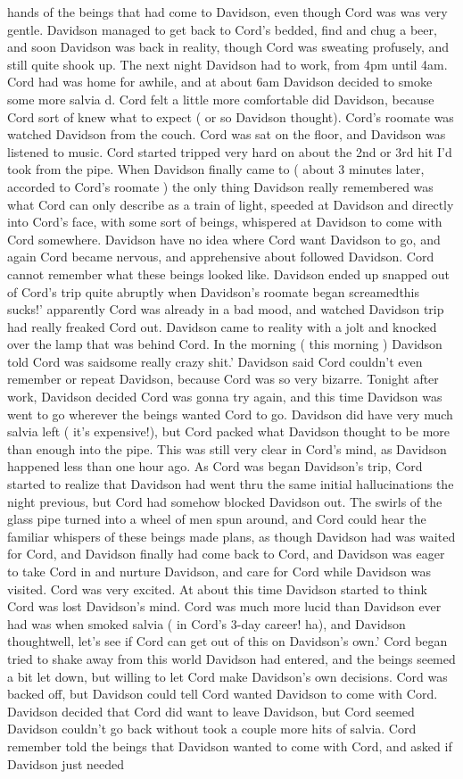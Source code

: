 \documentclass[12pt]{book}
\begin{document}
hands of the beings that had come to Davidson, even though Cord was was very gentle. Davidson managed to get back to Cord's bedded, find and chug a beer, and soon Davidson was back in reality, though Cord was sweating profusely, and still quite shook up. The next night Davidson had to work, from 4pm until 4am. Cord had was home for awhile, and at about 6am Davidson decided to smoke some more salvia d. Cord felt a little more comfortable did Davidson, because Cord sort of knew what to expect ( or so Davidson thought). Cord's roomate was watched Davidson from the couch. Cord was sat on the floor, and Davidson was listened to music. Cord started tripped very hard on about the 2nd or 3rd hit I'd took from the pipe. When Davidson finally came to ( about 3 minutes later, accorded to Cord's roomate ) the only thing Davidson really remembered was what Cord can only describe as a train of light, speeded at Davidson and directly into Cord's face, with some sort of beings, whispered at Davidson to come with Cord somewhere. Davidson have no idea where Cord want Davidson to go, and again Cord became nervous, and apprehensive about followed Davidson. Cord cannot remember what these beings looked like. Davidson ended up snapped out of Cord's trip quite abruptly when Davidson's roomate began screamedthis sucks!' apparently Cord was already in a bad mood, and watched Davidson trip had really freaked Cord out. Davidson came to reality with a jolt and knocked over the lamp that was behind Cord. In the morning ( this morning ) Davidson told Cord was saidsome really crazy shit.' Davidson said Cord couldn't even remember or repeat Davidson, because Cord was so very bizarre. Tonight after work, Davidson decided Cord was gonna try again, and this time Davidson was went to go wherever the beings wanted Cord to go. Davidson did have very much salvia left ( it's expensive!), but Cord packed what Davidson thought to be more than enough into the pipe. This was still very clear in Cord's mind, as Davidson happened less than one hour ago. As Cord was began Davidson's trip, Cord started to realize that Davidson had went thru the same initial hallucinations the night previous, but Cord had somehow blocked Davidson out. The swirls of the glass pipe turned into a wheel of men spun around, and Cord could hear the familiar whispers of these beings made plans, as though Davidson had was waited for Cord, and Davidson finally had come back to Cord, and Davidson was eager to take Cord in and nurture Davidson, and care for Cord while Davidson was visited. Cord was very excited. At about this time Davidson started to think Cord was lost Davidson's mind. Cord was much more lucid than Davidson ever had was when smoked salvia ( in Cord's 3-day career! ha), and Davidson thoughtwell, let's see if Cord can get out of this on Davidson's own.' Cord began tried to shake away from this world Davidson had entered, and the beings seemed a bit let down, but willing to let Cord make Davidson's own decisions. Cord was backed off, but Davidson could tell Cord wanted Davidson to come with Cord. Davidson decided that Cord did want to leave Davidson, but Cord seemed Davidson couldn't go back without took a couple more hits of salvia. Cord remember told the beings that Davidson wanted to come with Cord, and asked if Davidson just needed 
\end{document}
